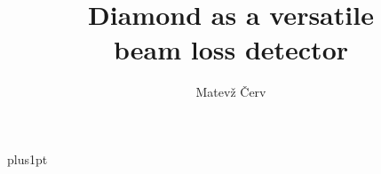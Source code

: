 \documentclass[11pt]{mytustyle}  %
\title{Diamond as a versatile\\[1ex]     %
        beam loss detector}   %
\author{Matev\v{z} \v{C}erv}             %
\begin{document}
\baselineskip=18pt plus1pt

\setcounter{secnumdepth}{3}
\setcounter{tocdepth}{3}


\maketitle                  %

\begin{romanpages}          %
\tableofcontents            %
\listoffigures              %
\end{romanpages}            %

%
%
%





%
%


\appendix
%
%



\end{document}
